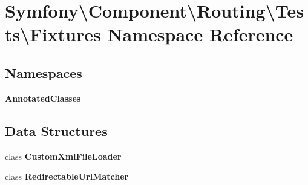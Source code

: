 \section{Symfony\textbackslash{}Component\textbackslash{}Routing\textbackslash{}Tests\textbackslash{}Fixtures Namespace Reference}
\label{namespace_symfony_1_1_component_1_1_routing_1_1_tests_1_1_fixtures}
\subsection*{Namespaces}
\begin{DoxyCompactItemize}
\item 
 {\bf Annotated\+Classes}
\end{DoxyCompactItemize}
\subsection*{Data Structures}
\begin{DoxyCompactItemize}
\item 
class {\bf Custom\+Xml\+File\+Loader}
\item 
class {\bf Redirectable\+Url\+Matcher}
\end{DoxyCompactItemize}
